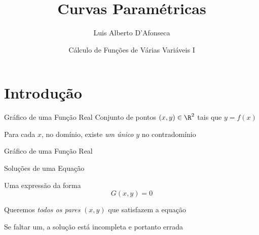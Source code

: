 
\usepackage{apresentacao}
\usepackage{mathconfig}
\usepackage{tabto}

\setlength{\parskip}{0.5\baselineskip}

\setcounter{exemplo}{0}

\makeatletter
\graphicspath  {{./figs/}}
\makeatother

\newcommand{\D}[2]{\frac{\partial {#1}}{\partial {#2}}}
\newcommand{\DS}[2]{\frac{\partial^2 {#1}}{\partial {#2}^2}}
\newcommand{\DM}[3]{\frac{\partial^2 {#1}}{\partial {#2} \partial {#3}}}

\title {Curvas Paramétricas}
\author{\large Luis Alberto D'Afonseca}
\date  {Cálculo de Funções de Várias Variáveis I}



\begin{frame}
    \titlepage
\end{frame}

\section{Introdução}


\begin{frame}{Gráfico de uma Função Real}
  Conjunto de pontos $(x, y) \in \R^2$ tais que \(y = f(x)\)

  \pause
  \vspace{\baselineskip}
  Para cada $x$, no domínio, existe \emph{um único} $y$ no contradomínio
\end{frame}

\begin{frame}{Gráfico de uma Função Real}
  \centering
  
\end{frame}

\begin{frame}{Soluções de uma Equação}

  Uma expressão da forma
  \[
    G(x, y) = 0
  \]

  \pause
  \vspace{\baselineskip}
  Queremos \emph{todos os pares} $(x, y)$ que satisfazem a equação

  \pause
  \vspace{\baselineskip}
  Se faltar um, a solução está incompleta e portanto errada
\end{frame}

